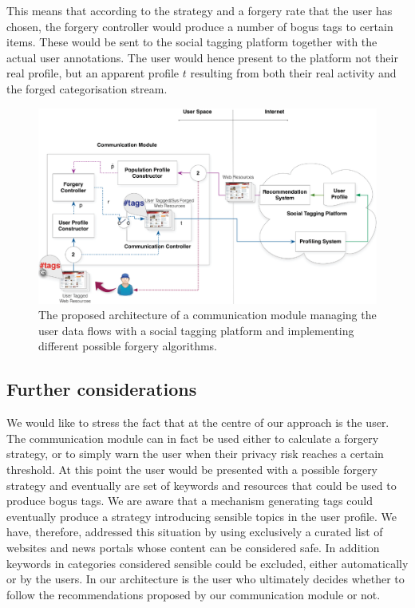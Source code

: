 This means that according to the strategy and a forgery rate that the user has chosen, the forgery controller would produce a number of bogus tags to certain items. These would be sent to the social tagging platform together with the actual user annotations. The user would hence present to the platform not their real profile, but an apparent profile $t$ resulting from both their real activity and the forged categorisation stream.

\begin{figure}[htb]  
\includegraphics[width=\textwidth]{figures/architecture.eps}
\caption[Architecture.]{The proposed architecture of a communication module managing the user data flows with a social tagging platform and implementing different possible forgery algorithms.
\label{fig:architecture}}
\end{figure}

\subsection{Further considerations}
\label{sec:further-considerations}
We would like to stress the fact that at the centre of our approach is the user. The communication module can in fact be used either to calculate a forgery strategy, or to simply warn the user when their privacy risk reaches a certain threshold. At this point the user would be presented with a possible forgery strategy and eventually are set of keywords and resources that could be used to produce bogus tags. We are aware that a mechanism generating tags could eventually produce a strategy introducing sensible topics in the user profile. We have, therefore, addressed this situation by using exclusively a curated list of websites and news portals whose content can be considered safe. In addition keywords in categories considered sensible could be excluded, either automatically or by the users. In our architecture is the user who ultimately decides whether to follow the recommendations proposed by our communication module or not. 

